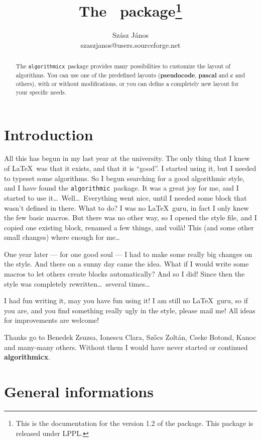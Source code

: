 \documentclass{article}
\title{The \alg\ package\footnote{This is the documentation for the version 1.2
of the package. This package is released under LPPL.}}
\author{Sz\'asz J\'anos\\szaszjanos@users.sourceforge.net}
\newcommand{\alg}{\texttt{algorithmicx}}
\newcommand{\old}{\texttt{algorithmic}}
\begin{document}
\maketitle
\begin{abstract}
The \alg\ package provides many possibilities to customize the layout of algorithms. 
You can use one of the predefined layouts (\textbf{pseudocode}, \textbf{pascal} 
and \textbf{c} and others), with or without modifications, or you can define a 
completely new layout for your specific needs.
\end{abstract}
\tableofcontents




\section{Introduction}
All this has begun in my last year at the university. The only thing that I knew of 
\LaTeX\ was that it exists, and that it is ``good''. I started using it, but I needed to typeset some 
algorithms. So I begun searching for a good algorithmic style, and I have found the \old\ package. 
It was a great joy for me, and I started to use it\dots\ 
Well\dots\ Everything went nice, until I needed some block that wasn't defined in there. What to do? 
I was no \LaTeX\ guru, in fact I only knew the few basic macros. But there was no other way, so I opened 
the style file, and I copied one existing block, renamed a few things, and voil\`a! This (and some other 
small changes) where enough for me\dots

One year later --- for one good soul --- I had to make some really big changes on the style. And there on 
a sunny day came the idea. What if I would write some macros to let others create blocks automatically? 
And so I did! Since then the style was completely rewritten\dots\ several times\dots

I had fun writing it, may you have fun using it! I am still no \LaTeX\ guru, so if you are, and you find 
something really ugly in the style, please mail me! All ideas for improvements are welcome!

Thanks go to Benedek Zsuzsa, Ionescu Clara, Sz\H ocs Zolt\'an, Cseke Botond, Kanoc 
and many-many others. Without them I would have never started or continued \textbf{algorithmicx}.




\section{General informations}
\end{document}
